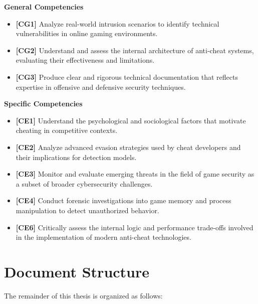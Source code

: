 \noindent\textbf{General Competencies}
\begin{itemize}
    \item \textbf{[CG1]} Analyze real-world intrusion scenarios to identify technical vulnerabilities in online gaming environments.
    \item \textbf{[CG2]} Understand and assess the internal architecture of anti-cheat systems, evaluating their effectiveness and limitations.
    \item \textbf{[CG3]} Produce clear and rigorous technical documentation that reflects expertise in offensive and defensive security techniques.
\end{itemize}

\newpage

\noindent\textbf{Specific Competencies}
\begin{itemize}
    \item \textbf{[CE1]} Understand the psychological and sociological factors that motivate cheating in competitive contexts.
    \item \textbf{[CE2]} Analyze advanced evasion strategies used by cheat developers and their implications for detection models.
    \item \textbf{[CE3]} Monitor and evaluate emerging threats in the field of game security as a subset of broader cybersecurity challenges.
    \item \textbf{[CE4]} Conduct forensic investigations into game memory and process manipulation to detect unauthorized behavior.
    \item \textbf{[CE6]} Critically assess the internal logic and performance trade-offs involved in the implementation of modern anti-cheat technologies.
\end{itemize}

\section*{Document Structure}

The remainder of this thesis is organized as follows:


